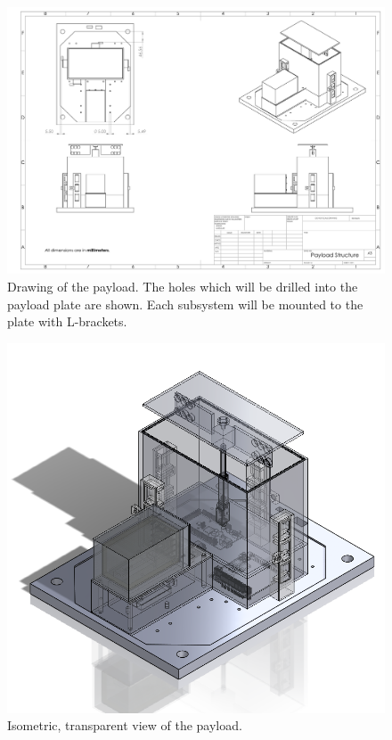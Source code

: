 \begin{centering}
  
  

  \begin{figure}[H]
    \includegraphics[width=\textwidth]{Figures/payload-structure-with-mount-holes.pdf}
    \caption{Drawing of the payload. The holes which will be drilled into the payload plate are shown. Each subsystem will be mounted to the plate with L-brackets. }
    \label{fig:payload-drawing}
  \end{figure}  
  \begin{figure}[H]
    \includegraphics[width=\textwidth]{Figures/payload-transparent.png}
    \caption{Isometric, transparent view of the payload.}
    \label{fig:payload-transparent}
  \end{figure}  
  

\end{centering}
